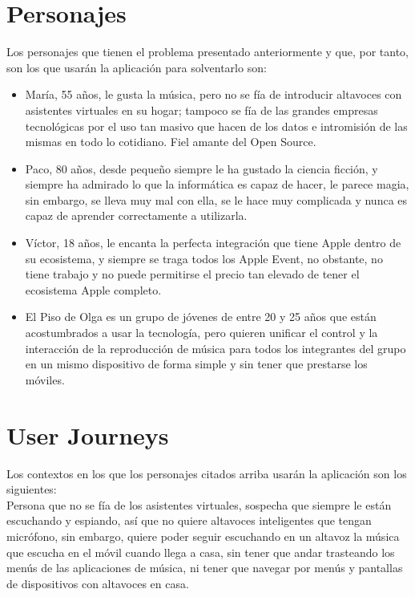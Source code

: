 \section{Personajes}
Los personajes que tienen el problema presentado anteriormente y que, por tanto,
son los que usarán la aplicación para solventarlo son:
\begin{itemize}
    \item María, 55 años, le gusta la música, pero no se fía de introducir
    altavoces con asistentes virtuales en su hogar; tampoco se fía de las
    grandes empresas tecnológicas por el uso tan masivo que hacen de los datos e
    intromisión de las mismas en todo lo cotidiano. Fiel amante del Open Source.
    \item Paco, 80 años, desde pequeño siempre le ha gustado la ciencia ficción,
    y siempre ha admirado lo que la informática es capaz de hacer, le parece
    magia, sin embargo, se lleva muy mal con ella, se le hace muy complicada y
    nunca es capaz de aprender correctamente a utilizarla.
    \item Víctor, 18 años, le encanta la perfecta integración que tiene Apple
    dentro de su ecosistema, y siempre se traga todos los Apple Event, no
    obstante, no tiene trabajo y no puede permitirse el precio tan elevado de
    tener el ecosistema Apple completo.
    \item El Piso de Olga es un grupo de jóvenes de entre 20 y 25 años que están
    acostumbrados a usar la tecnología, pero quieren unificar el control y la
    interacción de la reproducción de música para todos los integrantes del
    grupo en un mismo dispositivo de forma simple y sin tener que prestarse los
    móviles.
\end{itemize}

\section{User Journeys}
Los contextos en los que los personajes citados arriba usarán la aplicación son
los siguientes:\\

Persona que no se fía de los asistentes virtuales, sospecha que siempre le están
escuchando y espiando, así que no quiere altavoces inteligentes que tengan
micrófono, sin embargo, quiere poder seguir escuchando en un altavoz la música
que escucha en el móvil cuando llega a casa, sin tener que andar trasteando los
menús de las aplicaciones de música, ni tener que navegar por menús y pantallas
de dispositivos con altavoces en casa.\\

